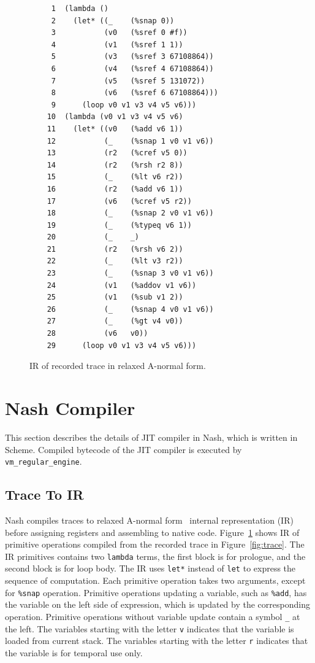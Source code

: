 \documentclass[preprint, 10pt]{sigplanconf}
\begin{document}
\begin{figure}
  \centering
  \small
\begin{verbatim}
     1	(lambda ()
     2    (let* ((_    (%snap 0))
     3           (v0   (%sref 0 #f))
     4           (v1   (%sref 1 1))
     5           (v3   (%sref 3 67108864))
     6           (v4   (%sref 4 67108864))
     7           (v5   (%sref 5 131072))
     8           (v6   (%sref 6 67108864)))
     9      (loop v0 v1 v3 v4 v5 v6)))
    10	(lambda (v0 v1 v3 v4 v5 v6)
    11    (let* ((v0   (%add v6 1))
    12           (_    (%snap 1 v0 v1 v6))
    13           (r2   (%cref v5 0))
    14           (r2   (%rsh r2 8))
    15           (_    (%lt v6 r2))
    16           (r2   (%add v6 1))
    17           (v6   (%cref v5 r2))
    18           (_    (%snap 2 v0 v1 v6))
    19           (_    (%typeq v6 1))
    20           (_    _)
    21           (r2   (%rsh v6 2))
    22           (_    (%lt v3 r2))
    23           (_    (%snap 3 v0 v1 v6))
    24           (v1   (%addov v1 v6))
    25           (v1   (%sub v1 2))
    26           (_    (%snap 4 v0 v1 v6))
    27           (_    (%gt v4 v0))
    28           (v6   v0))
    29      (loop v0 v1 v3 v4 v5 v6)))
\end{verbatim}
\caption{IR of recorded trace in relaxed A-normal form.}
\label{fig:anf}
\end{figure}

\section{Nash Compiler}
\label{sec:compiler}

This section describes the details of JIT compiler in Nash, which is written in
Scheme. Compiled bytecode of the JIT compiler is executed by
\texttt{vm\_regular\_engine}.

\subsection{Trace To IR}
Nash compiles traces to relaxed A-normal form~\cite{flanagan1993essence}
internal representation (IR) before assigning registers and assembling to native
code. Figure~\hyperref[fig:anf]{\ref{fig:anf}} shows IR of primitive operations
compiled from the recorded trace in
Figure~\hyperref[fig:trace]{\ref{fig:trace}}. The IR primitives contains two
\texttt{lambda} terms, the first block is for prologue, and the second block is
for loop body. The IR uses \texttt{let*} instead of \texttt{let} to express the
sequence of computation. Each primitive operation takes two arguments, except
for \texttt{\%snap} operation. Primitive operations updating a variable, such as
\texttt{\%add}, has the variable on the left side of expression, which is
updated by the corresponding operation. Primitive operations without variable
update contain a symbol \texttt{\_} at the left. The variables starting with the
letter \texttt{v} indicates that the variable is loaded from current stack. The
variables starting with the letter \texttt{r} indicates that the variable is for
temporal use only.
\end{document}
